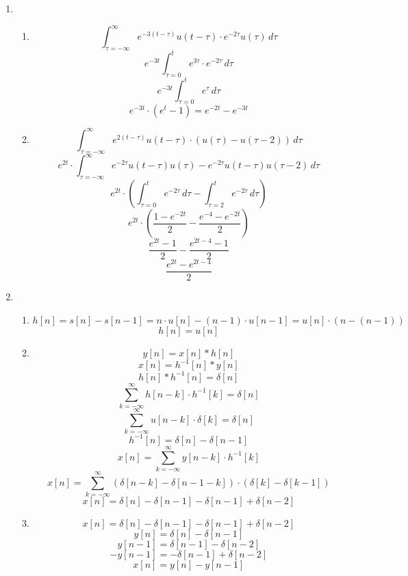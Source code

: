 \documentclass[10pt,a4paper, margin=1in]{article}
\begin{document}
\begin{enumerate}
\begin{enumerate}
    \end{enumerate}

\newpage 

\item %
    \begin{enumerate}
    \item %
    \[ \int_{\tau=-\infty}^{\infty} e^{-3(t-\tau)} u(t - \tau) \cdot e^{-2\tau} u(\tau) \,d\tau \]
    \[ e^{-3t} \int_{\tau=0}^{t} e^{3\tau} \cdot e^{-2\tau} \,d\tau \]
    \[ e^{-3t} \int_{\tau=0}^{t} e^{\tau} \,d\tau \]
    \[ e^{-3t} \cdot (e^{t} - 1) = e^{-2t} - e^{-3t} \]
    \item %
    \[ \int_{\tau=-\infty}^{\infty} e^{2(t-\tau)} u(t - \tau) \cdot (u(\tau) - u(\tau - 2)) \,d\tau \]
    \[ e^{2t} \cdot \int_{\tau=-\infty}^{\infty} e^{-2\tau} u(t - \tau) u(\tau) - e^{-2\tau} u(t - \tau) u(\tau - 2) \,d\tau \]
    \[ e^{2t} \cdot (\int_{\tau=0}^{t} e^{-2\tau} \,d\tau - \int_{\tau=2}^{t} e^{-2\tau} \,d\tau) \]
    \[ e^{2t} \cdot (\frac{1 - e^{-2t}}{2} - \frac{e^{-4} - e^{-2t}}{2}) \]
    \[\frac{e^{2t} - 1}{2} - \frac{e^{2t - 4} - 1}{2} \]
    \[\frac{e^{2t} - e^{2t-4}}{2} \]
    \end{enumerate}

\item %
    \begin{enumerate}
    \item %

\[ h[n] = s[n] - s[n-1] = n \cdot u[n] - (n-1) \cdot u[n-1]  = u[n] \cdot(n - (n-1))\]
\[ h[n] = u[n] \]
    \item %
\[ y[n] = x[n] * h[n] \]
\[ x[n] = h^{-1}[n] * y[n] \]
\[ h[n] * h^{-1}[n] = \delta[n] \]
\[ \sum_{k=-\infty}^{\infty} h[n - k] \cdot h^{-1}[k] = \delta[n] \]
\[ \sum_{k=-\infty}^{\infty} u[n - k] \cdot \delta[k] = \delta[n] \]
\[ h^{-1}[n] = \delta[n] - \delta[n-1] \]
\[ x[n] = \sum_{k=-\infty}^{\infty} y[n - k] \cdot h^{-1}[k] \]
\[ x[n] = \sum_{k=-\infty}^{\infty} (\delta[n-k] - \delta[n-1-k]) \cdot (\delta[k] - \delta[k-1]) \]
\[ x[n] = \delta[n] - \delta[n-1] - \delta[n-1] + \delta[n-2] \]

    \item %
    
\[ x[n] = \delta[n] - \delta[n-1] - \delta[n-1] + \delta[n-2] \]
\[ y[n] = \delta[n] - \delta[n-1] \]
\[ y[n-1] = \delta[n-1] - \delta[n-2] \]
\[ -y[n-1] = -\delta[n-1] + \delta[n-2] \]
\[ x[n] = y[n] - y[n-1]\]
    \end{enumerate}


\end{enumerate}
\end{document}
